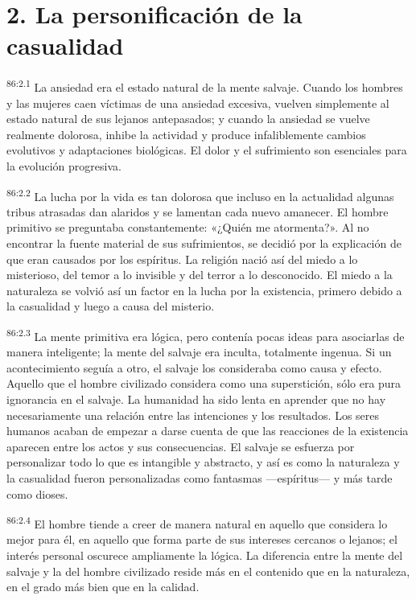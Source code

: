 \section*{2. La personificación de la casualidad}
\par
\textsuperscript{86:2.1} La ansiedad era el estado natural de la mente salvaje. Cuando los hombres y las mujeres caen víctimas de una ansiedad excesiva, vuelven simplemente al estado natural de sus lejanos antepasados; y cuando la ansiedad se vuelve realmente dolorosa, inhibe la actividad y produce infaliblemente cambios evolutivos y adaptaciones biológicas. El dolor y el sufrimiento son esenciales para la evolución progresiva.

\par
\textsuperscript{86:2.2} La lucha por la vida es tan dolorosa que incluso en la actualidad algunas tribus atrasadas dan alaridos y se lamentan cada nuevo amanecer. El hombre primitivo se preguntaba constantemente: «¿Quién me atormenta?». Al no encontrar la fuente material de sus sufrimientos, se decidió por la explicación de que eran causados por los espíritus. La religión nació así del miedo a lo misterioso, del temor a lo invisible y del terror a lo desconocido. El miedo a la naturaleza se volvió así un factor en la lucha por la existencia, primero debido a la casualidad y luego a causa del misterio.

\par
\textsuperscript{86:2.3} La mente primitiva era lógica, pero contenía pocas ideas para asociarlas de manera inteligente; la mente del salvaje era inculta, totalmente ingenua. Si un acontecimiento seguía a otro, el salvaje los consideraba como causa y efecto. Aquello que el hombre civilizado considera como una superstición, sólo era pura ignorancia en el salvaje. La humanidad ha sido lenta en aprender que no hay necesariamente una relación entre las intenciones y los resultados. Los seres humanos acaban de empezar a darse cuenta de que las reacciones de la existencia aparecen entre los actos y sus consecuencias. El salvaje se esfuerza por personalizar todo lo que es intangible y abstracto, y así es como la naturaleza y la casualidad fueron personalizadas como fantasmas ---espíritus--- y más tarde como dioses.

\par
\textsuperscript{86:2.4} El hombre tiende a creer de manera natural en aquello que considera lo mejor para él, en aquello que forma parte de sus intereses cercanos o lejanos; el interés personal oscurece ampliamente la lógica. La diferencia entre la mente del salvaje y la del hombre civilizado reside más en el contenido que en la naturaleza, en el grado más bien que en la calidad.

